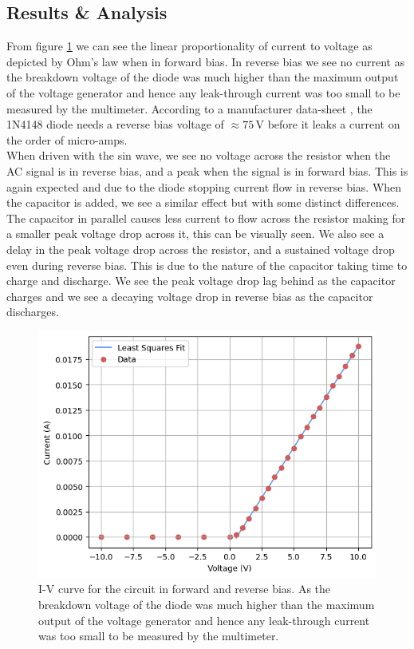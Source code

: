 \documentclass[%
reprint,
amsmath,amssymb,
aps,
floatfix
]{revtex4-2}
\begin{document}
		\subsection{Results \& Analysis}
		From figure \ref{fig:IVCurveLinear} we can see the linear proportionality of current to voltage as depicted by Ohm's law when in forward bias. In reverse bias we see no current as the breakdown voltage of the diode was much higher than the maximum output of the voltage generator and hence any leak-through current was too small to be measured by the multimeter. According to a manufacturer data-sheet \cite{diodeData}, the 1N4148 diode needs a reverse bias voltage of $\approx 75 \,\text{V}$ before it leaks a current on the order of micro-amps.\\
		
		When driven with the sin wave, we see no voltage across the resistor when the AC signal is in reverse bias, and a peak when the signal is in forward bias. This is again expected and due to the diode stopping current flow in reverse bias. When the capacitor is added, we see a similar effect but with some distinct differences. The capacitor in parallel causes less current to flow across the resistor making for a smaller peak voltage drop across it, this can be visually seen. We also see a delay in the peak voltage drop across the resistor, and a sustained voltage drop even during reverse bias. This is due to the nature of the capacitor taking time to charge and discharge. We see the peak voltage drop lag behind as the capacitor charges and we see a decaying voltage drop in reverse bias as the capacitor discharges.
		
		\begin{figure}
			\includegraphics[width=0.85\columnwidth]{IVCurveLinear.png}
			\caption{\label{fig:IVCurveLinear}I-V curve for the circuit in forward and reverse bias. As the breakdown voltage of the diode was much higher than the maximum output of the voltage generator and hence any leak-through current was too small to be measured by the multimeter.}
		\end{figure}
	
\end{document}
